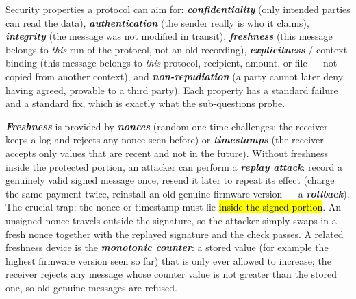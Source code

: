 \documentclass[12pt, a4paper]{article}
\newcommand{\term}[1]{\textbf{\textit{#1}}}        %
\newcommand{\imp}[1]{\hl{#1}}                       %
\begin{document}
Security properties a protocol can aim for: \term{confidentiality} (only intended parties can read the data), \term{authentication} (the sender really is who it claims), \term{integrity} (the message was not modified in transit), \term{freshness} (this message belongs to \emph{this} run of the protocol, not an old recording), \term{explicitness} / context binding (this message belongs to \emph{this} protocol, recipient, amount, or file --- not copied from another context), and \term{non-repudiation} (a party cannot later deny having agreed, provable to a third party). Each property has a standard failure and a standard fix, which is exactly what the sub-questions probe.

\term{Freshness} is provided by \term{nonces} (random one-time challenges; the receiver keeps a log and rejects any nonce seen before) or \term{timestamps} (the receiver accepts only values that are recent and not in the future). Without freshness inside the protected portion, an attacker can perform a \term{replay attack}: record a genuinely valid signed message once, resend it later to repeat its effect (charge the same payment twice, reinstall an old genuine firmware version --- a \term{rollback}). The crucial trap: the nonce or timestamp must lie \imp{inside the signed portion}. An unsigned nonce travels outside the signature, so the attacker simply swaps in a fresh nonce together with the replayed signature and the check passes. A related freshness device is the \term{monotonic counter}: a stored value (for example the highest firmware version seen so far) that is only ever allowed to increase; the receiver rejects any message whose counter value is not greater than the stored one, so old genuine messages are refused.
\end{document}
